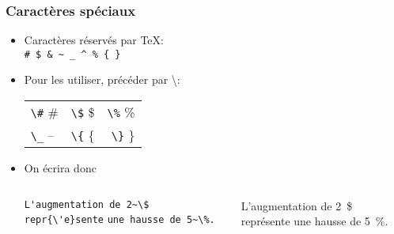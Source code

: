 \begin{frame}[fragile]

	\frametitle{Caractères spéciaux}
	
	\begin{itemize}
		\item Caractères réservés par \TeX  : \\
		\lstinline|# $ & ~ _ ^ % { }|
		
		\item Pour les utiliser, précéder par \textbackslash  :\\
		\begin{tabular}{lcr}
			\lstinline|\#|  \#	&	\lstinline|\$|  \$	&	\lstinline|\%|  \% \\
			\lstinline|\_|  --	&	\lstinline|\{|  \{	&	\lstinline|\}|  \}
		\end{tabular}
	
		\item On écrira donc
		
		\begin{columns}
			
			\lstinline|L'augmentation de 2~\$ repr{\'e}sente|
			\lstinline|une hausse de 5~\%.|
			
			
			L’augmentation de 2~\$ représente une hausse de 5~\%.
		\end{columns}
	\end{itemize}

\end{frame}


